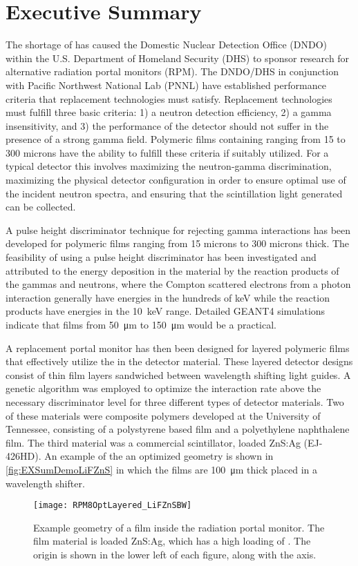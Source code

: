 \chapter*{Executive Summary}
The shortage of  has caused the Domestic Nuclear Detection Office (DNDO) within the U.S. Department of Homeland Security (DHS) to sponsor research for alternative radiation portal monitors (RPM).
The DNDO/DHS in conjunction with Pacific Northwest National Lab (PNNL) have established performance criteria that replacement technologies must satisfy.
Replacement technologies must fulfill three basic criteria: 1) a neutron detection efficiency, 2) a gamma insensitivity, and 3) the performance of the detector should not suffer in the presence of a strong gamma field.
Polymeric films containing  ranging from 15 to 300 microns have the ability to fulfill these criteria if suitably utilized.
For a typical detector this involves maximizing the neutron-gamma discrimination, maximizing the physical detector configuration in order to ensure optimal use of the incident neutron spectra, and ensuring that the scintillation light generated can be collected.

A pulse height discriminator technique for rejecting gamma interactions has been developed for polymeric films ranging from 15 microns to 300 microns thick.
The feasibility of using a pulse height discriminator has been investigated and attributed to the energy deposition in the material by the reaction products of the gammas and neutrons, where the Compton scattered electrons from a photon interaction generally have energies in the hundreds of keV while the  reaction products have energies in the \SI{10}{\keV} range. 
Detailed GEANT4 simulations indicate that films from \SI{50}{\um} to \SI{150}{\um} would be a practical.

A replacement portal monitor has then been designed for layered polymeric films that effectively utilize the  in the detector material. 
These layered detector designs consist of thin film layers sandwiched between wavelength shifting light guides.
A genetic algorithm was employed to optimize the interaction rate above the necessary discriminator level for three different types of detector materials.
Two of these materials were composite polymers developed at the University of Tennessee, consisting of a polystyrene based film and a polyethylene naphthalene film.
The third material was a commercial scintillator,  loaded ZnS:Ag (EJ-426HD).
An example of the an optimized geometry is shown in \autoref{fig:EXSumDemoLiFZnS} in which the films are \SI{100}{\um} thick placed in a wavelength shifter.
\begin{figure}
  \centering
  \texttt{[image: RPM8OptLayered\_LiFZnSBW]}
  \caption[]{Example geometry of a film inside the radiation portal monitor. The film material is  loaded ZnS:Ag, which has a high loading of . The origin is shown in the lower left of each figure, along with the axis.}
  \label{fig:EXSumDemoLiFZnS}
\end{figure}

